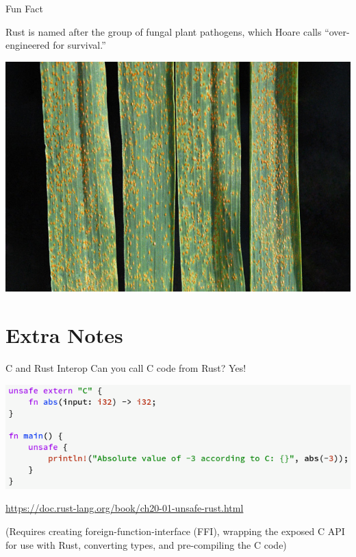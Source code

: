 \documentclass{beamer}
\begin{document}
\begin{frame} {Fun Fact}
\begin{block}{}
Rust is named after the group of fungal plant pathogens, which Hoare calls “over-engineered for survival.”
\end{block}
\begin{center} 
\includegraphics[scale=0.3]{Wheat_leaf_rust_on_wheat}
\end{center}
\end{frame} 


\section{Extra Notes} 
\sectionpage




\begin{frame}{C and Rust Interop} 
Can you call C code from Rust? Yes! 

\includegraphics[scale=0.4]{calling-external}

\url{https://doc.rust-lang.org/book/ch20-01-unsafe-rust.html} 

(Requires creating foreign-function-interface (FFI), 
wrapping the exposed C API for use with Rust, converting types, and pre-compiling the C code)
\end{frame} 
\end{document}
